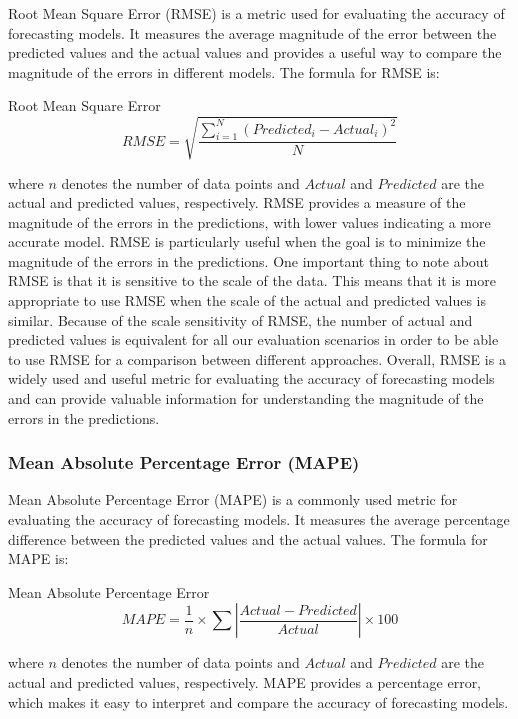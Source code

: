       Root Mean Square Error (RMSE) \cite{chaiRootMeanSquare2014} is a metric used for evaluating the accuracy of forecasting models. It measures the average magnitude of the error between the predicted values and the actual values and provides a useful way to compare the magnitude of the errors in different models.
      The formula for RMSE is:
      \begin{pabox}{Root Mean Square Error}
        $$RMSE = \sqrt{\frac{\sum_{i = 1}^{N}\left(Predicted_i - Actual_i\right)^2}{N}}$$
      \end{pabox}
      where $n$ denotes the number of data points and $Actual$ and $Predicted$ are the actual and predicted values, respectively.
      RMSE provides a measure of the magnitude of the errors in the predictions, with lower values indicating a more accurate model. 
      RMSE is particularly useful when the goal is to minimize the magnitude of the errors in the predictions.
      One important thing to note about RMSE is that it is sensitive to the scale of the data. This means that it is more appropriate to use RMSE when the scale of the actual and predicted values is similar.
      Because of the scale sensitivity of RMSE, the number of actual and predicted values is equivalent for all our evaluation scenarios in order to be able to use RMSE for a comparison between different approaches.
      Overall, RMSE is a widely used and useful metric for evaluating the accuracy of forecasting models and can provide valuable information for understanding the magnitude of the errors in the predictions.


    \subsubsection{Mean Absolute Percentage Error (MAPE)}
    \label{sec:mape-metrics-evaluation}

      Mean Absolute Percentage Error (MAPE) \cite{demyttenaereMeanAbsolutePercentage2016} is a commonly used metric for evaluating the accuracy of forecasting models. It measures the average percentage difference between the predicted values and the actual values.
      The formula for MAPE is:

      \begin{pabox}{Mean Absolute Percentage Error}
        $$MAPE = \frac{1}{n} \times \sum \left|\frac{Actual - Predicted}{Actual}\right| \times 100$$
      \end{pabox}
      where $n$ denotes the number of data points and $Actual$ and $Predicted$ are the actual and predicted values, respectively.
      MAPE provides a percentage error, which makes it easy to interpret and compare the accuracy of forecasting models. 
      
